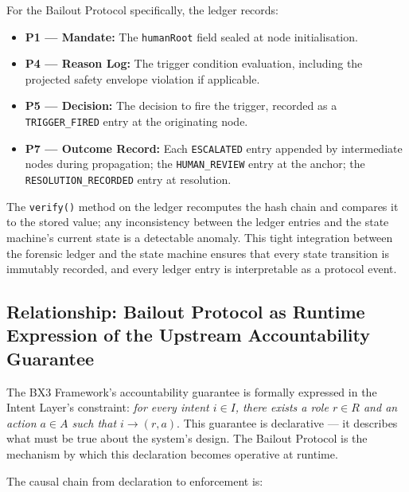 \documentclass[12pt]{article}
\begin{document}
For the Bailout Protocol specifically, the ledger records:
\begin{itemize}
  \item \textbf{P1 --- Mandate:} The \texttt{humanRoot} field sealed at node initialisation.
  \item \textbf{P4 --- Reason Log:} The trigger condition evaluation, including the projected safety envelope violation if applicable.
  \item \textbf{P5 --- Decision:} The decision to fire the trigger, recorded as a \texttt{TRIGGER\_FIRED} entry at the originating node.
  \item \textbf{P7 --- Outcome Record:} Each \texttt{ESCALATED} entry appended by intermediate nodes during propagation; the \texttt{HUMAN\_REVIEW} entry at the anchor; the \texttt{RESOLUTION\_RECORDED} entry at resolution.
\end{itemize}

The \texttt{verify()} method on the ledger recomputes the hash chain and compares it to the stored value; any inconsistency between the ledger entries and the state machine's current state is a detectable anomaly. This tight integration between the forensic ledger and the state machine ensures that every state transition is immutably recorded, and every ledger entry is interpretable as a protocol event.

\subsection{Relationship: Bailout Protocol as Runtime Expression of the
            Upstream Accountability Guarantee}
\label{sec:bailout-runtime-expression}

The BX3 Framework's accountability guarantee is formally expressed in the Intent Layer's constraint: \emph{for every intent $i \in I$, there exists a role $r \in R$ and an action $a \in A$ such that $i \rightarrow (r, a)$}. This guarantee is declarative --- it describes what must be true about the system's design. The Bailout Protocol is the mechanism by which this declaration becomes operative at runtime.

The causal chain from declaration to enforcement is:
\end{document}
